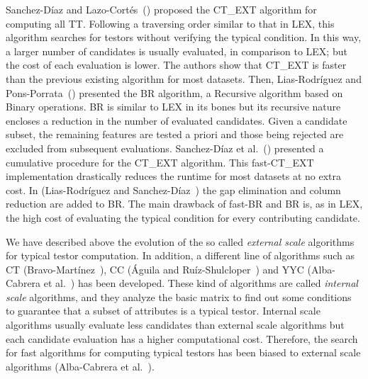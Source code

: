 \documentclass[citeauthoryear]{llncs}
\begin{document}
	Sanchez-D\'iaz and Lazo-Cort\'es~(\cite{Sanchez2007}) proposed the CT\_EXT algorithm for computing all TT. Following a traversing order similar to that in LEX, this algorithm searches for testors without verifying the typical condition. In this way, a larger number of candidates is usually evaluated, in comparison to LEX; but the cost of each evaluation is lower. The authors show that CT\_EXT is faster than the previous existing algorithm for most datasets. Then, Lias-Rodr\'iguez and Pons-Porrata~(\cite{Lias2009}) presented the BR algorithm, a Recursive algorithm based on Binary operations. BR is similar to LEX in its bones but its recursive nature encloses a reduction in the number of evaluated candidates. Given a candidate subset, the remaining features are tested a priori and those being rejected are excluded from subsequent evaluations. Sanchez-D\'iaz et al.~(\cite{Sanchez2010}) presented a cumulative procedure for the CT\_EXT algorithm. This fast-CT\_EXT implementation drastically reduces the runtime for most datasets at no extra cost. In (Lias-Rodr\'iguez and Sanchez-D\'iaz~\cite{Lias2013}) the gap elimination and column reduction are added to BR. The main drawback of fast-BR and BR is, as in LEX, the high cost of evaluating the typical condition for every contributing candidate. 
	
	We have described above the evolution of the so called \emph{external scale} algorithms for typical testor computation. In addition, a different line of algorithms such as CT (Bravo-Martínez~\cite{Bravo83}), CC (Águila and Ruíz-Shulcloper~\cite{Aguila84}) and YYC (Alba-Cabrera et al.~\cite{Alba14}) has been developed. These kind of algorithms are called \emph{internal scale} algorithms, and they analyze the basic matrix to find out some conditions to guarantee that a subset of attributes is a typical testor. Internal scale algorithms usually evaluate less candidates than external scale algorithms but each candidate evaluation has a higher computational cost. Therefore, the search for fast algorithms for computing typical testors has been biased to external scale algorithms (Alba-Cabrera et al.~\cite{Alba14}).
	
\end{document}
